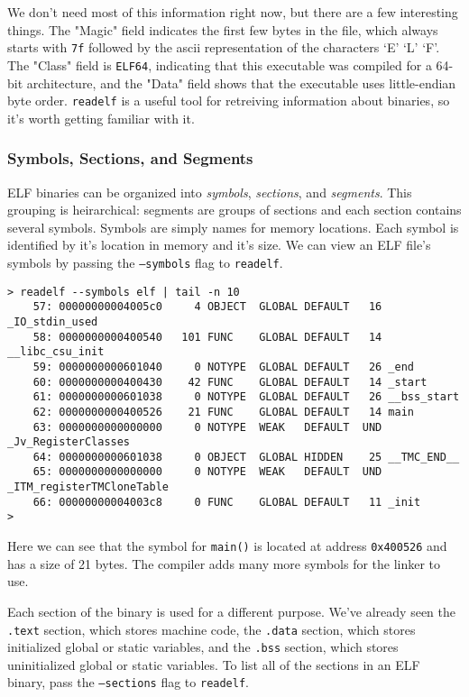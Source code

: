 We don't need most of this information right now, but there are a few
interesting things. The "Magic" field indicates the first few bytes in the file,
which always starts with \texttt{7f} followed by the ascii representation of the
characters `E' `L' `F'. The "Class" field is \texttt{ELF64}, indicating that
this executable was compiled for a 64-bit architecture, and the "Data" field
shows that the executable uses little-endian byte order. \texttt{readelf} is a
useful tool for retreiving information about binaries, so it's worth getting
familiar with it.

\subsubsection{Symbols, Sections, and Segments}
ELF binaries can be organized into \emph{symbols}, \emph{sections}, and
\emph{segments}. This grouping is heirarchical: segments are groups of sections
and each section contains several symbols. Symbols are simply names for memory
locations. Each symbol is identified by it's location in memory and it's size.
We can view an ELF file's symbols by passing the \texttt{--symbols} flag to
\texttt{readelf}.

\begin{lstlisting}
> readelf --symbols elf | tail -n 10
    57: 00000000004005c0     4 OBJECT  GLOBAL DEFAULT   16 _IO_stdin_used
    58: 0000000000400540   101 FUNC    GLOBAL DEFAULT   14 __libc_csu_init
    59: 0000000000601040     0 NOTYPE  GLOBAL DEFAULT   26 _end
    60: 0000000000400430    42 FUNC    GLOBAL DEFAULT   14 _start
    61: 0000000000601038     0 NOTYPE  GLOBAL DEFAULT   26 __bss_start
    62: 0000000000400526    21 FUNC    GLOBAL DEFAULT   14 main
    63: 0000000000000000     0 NOTYPE  WEAK   DEFAULT  UND _Jv_RegisterClasses
    64: 0000000000601038     0 OBJECT  GLOBAL HIDDEN    25 __TMC_END__
    65: 0000000000000000     0 NOTYPE  WEAK   DEFAULT  UND _ITM_registerTMCloneTable
    66: 00000000004003c8     0 FUNC    GLOBAL DEFAULT   11 _init
> 
\end{lstlisting}

Here we can see that the symbol for \texttt{main()} is located at address
\texttt{0x400526} and has a size of 21 bytes. The compiler adds many more
symbols for the linker to use.

Each section of the binary is used for a different purpose. We've already seen
the  \texttt{.text} section, which stores machine code, the \texttt{.data}
section, which stores initialized global or static variables, and the
\texttt{.bss} section, which stores uninitialized global or static variables. To
list all of the sections in an ELF binary, pass the \texttt{--sections} flag to
\texttt{readelf}.

